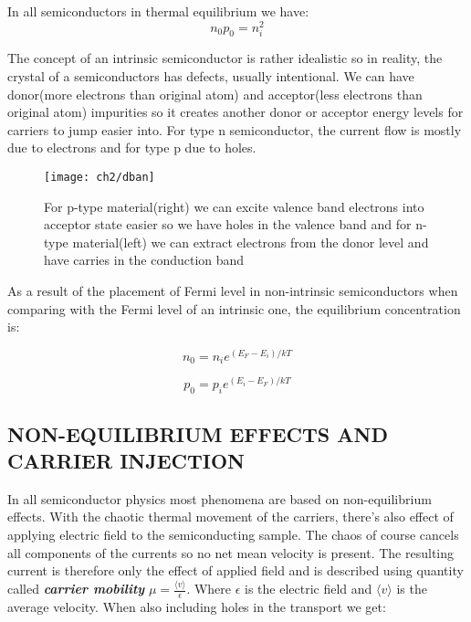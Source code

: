 In all semiconductors in thermal equilibrium we have:
\begin{equation}
n_0p_0 = n_i^2
\end{equation}

The concept of an intrinsic semiconductor is rather idealistic so in reality, the crystal of a semiconductors has defects, usually intentional. We can have donor(more electrons than original atom) and acceptor(less electrons than original atom) impurities so it creates another donor or acceptor energy levels for carriers to jump easier into. For type n semiconductor, the current flow is mostly due to electrons and for type p due to holes.

\begin{figure}
\centering
\texttt{[image: ch2/dban]}
\caption{For p-type material(right) we can excite valence band electrons into acceptor state easier so we have holes in the valence band and for n-type material(left) we can extract electrons from the donor level and have carries in the conduction band\cite{hyper}}
\end{figure}

As a result of the placement of Fermi level in non-intrinsic semiconductors when comparing with the Fermi level of an intrinsic one, the equilibrium concentration is:

\begin{equation}
n_0=n_ie^{(E_F-E_i)/kT}
\end{equation}

\begin{equation}
p_0=p_ie^{(E_i-E_F)/kT}
\end{equation}

\subsection{NON-EQUILIBRIUM EFFECTS AND CARRIER INJECTION}

In all semiconductor physics most phenomena are based on non-equilibrium effects. With the chaotic thermal movement of the carriers, there's also effect of applying electric field to the semiconducting sample. The chaos of course cancels all components of the currents so no net mean velocity is present. The resulting current is therefore only the effect of applied field and is described using quantity called \textit{\textbf{carrier mobility}} $\mu =\frac{\langle v \rangle }{\epsilon }$. Where $\epsilon$ is the electric field and $\langle v\rangle $ is the average velocity. When also including holes in the transport we get:

